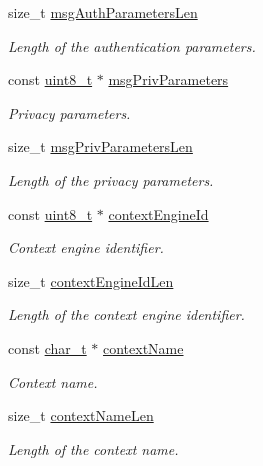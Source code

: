 \begin{DoxyCompactItemize}
size\+\_\+t \hyperlink{structSnmpMessage_a7b01dd73a305c550a38594c273feef27}{msg\+Auth\+Parameters\+Len}
\begin{DoxyCompactList}\small\item\em Length of the authentication parameters. \end{DoxyCompactList}\item 
const \hyperlink{stdint_8h_aba7bc1797add20fe3efdf37ced1182c5}{uint8\+\_\+t} $\ast$ \hyperlink{structSnmpMessage_a06518359392967750bc6139130d489ef}{msg\+Priv\+Parameters}
\begin{DoxyCompactList}\small\item\em Privacy parameters. \end{DoxyCompactList}\item 
size\+\_\+t \hyperlink{structSnmpMessage_afe1bf1cf0a488e38bc8b6017528c35e9}{msg\+Priv\+Parameters\+Len}
\begin{DoxyCompactList}\small\item\em Length of the privacy parameters. \end{DoxyCompactList}\item 
const \hyperlink{stdint_8h_aba7bc1797add20fe3efdf37ced1182c5}{uint8\+\_\+t} $\ast$ \hyperlink{structSnmpMessage_a737a67e1857fb23d90d149cfb0d21e1c}{context\+Engine\+Id}
\begin{DoxyCompactList}\small\item\em Context engine identifier. \end{DoxyCompactList}\item 
size\+\_\+t \hyperlink{structSnmpMessage_ad933640b1912b549e6f1a9280a5ce7b7}{context\+Engine\+Id\+Len}
\begin{DoxyCompactList}\small\item\em Length of the context engine identifier. \end{DoxyCompactList}\item 
const \hyperlink{compiler__port_8h_a40bb5262bf908c328fbcfbe5d29d0201}{char\+\_\+t} $\ast$ \hyperlink{structSnmpMessage_ab7b3dc54e8e1538249e1e0e08123f0f9}{context\+Name}
\begin{DoxyCompactList}\small\item\em Context name. \end{DoxyCompactList}\item 
size\+\_\+t \hyperlink{structSnmpMessage_a64d47bc4ef9cdfaae0494c8b224b26cb}{context\+Name\+Len}
\begin{DoxyCompactList}\small\item\em Length of the context name. \end{DoxyCompactList}\item 

\end{DoxyCompactItemize}
